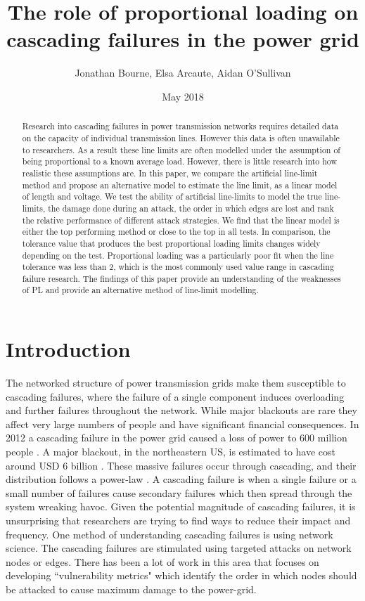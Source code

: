 \documentclass{article}
\title{The role of proportional loading on cascading failures in the power grid}
\author{Jonathan Bourne, Elsa Arcaute, Aidan O'Sullivan}
\date{May 2018}
\begin{document}
\maketitle


\begin{abstract}
Research into cascading failures in power transmission networks requires detailed data on the capacity of individual transmission lines. However this data is often unavailable to researchers. As a result these line limits are often modelled under the assumption of being proportional to a known average load. However, there is little research into how realistic these assumptions are. In this paper, we compare the artificial line-limit method and propose an alternative model to estimate the line limit, as a linear model of length and voltage. 
We test the ability of artificial line-limits to model the true line-limits, the damage done during an attack, the order in which edges are lost and rank the relative performance of different attack strategies.
We find that the linear model is either the top performing method or close to the top in all tests. In comparison, the tolerance value that produces the best proportional loading limits changes widely depending on the test. Proportional loading was a particularly poor fit when the line tolerance was less than 2, which is the most commonly used value range in cascading failure research. The findings of this paper provide an understanding of the weaknesses of PL and provide an alternative method of line-limit modelling.
\end{abstract}


\section{Introduction}
The networked structure of power transmission grids make them susceptible to cascading failures, where the failure of a single component induces overloading and further failures throughout the network. While major blackouts are rare they affect very large numbers of people and have significant financial consequences. In 2012 a cascading failure in the power grid caused a loss of power to 600 million people \cite{Hengdao2017}. A major blackout, in the northeastern US, is estimated to have cost around USD 6 billion \cite{2014CountingUK}. These massive failures occur through cascading, and their distribution follows a power-law \cite{Dobson2004, Carreras2016, Hines2009}. A cascading failure is when a single failure or a small number of failures cause secondary failures which then spread through the system wreaking havoc. 
Given the potential magnitude of cascading failures, it is unsurprising that researchers are trying to find ways to reduce their impact and frequency. One method of understanding cascading failures is using network science. The cascading failures are stimulated using targeted attacks on network nodes or edges. There has been a lot of work in this area that focuses on developing ``vulnerability metrics" which identify the order in which nodes should be attacked to cause maximum damage to the power-grid.
\end{document}
